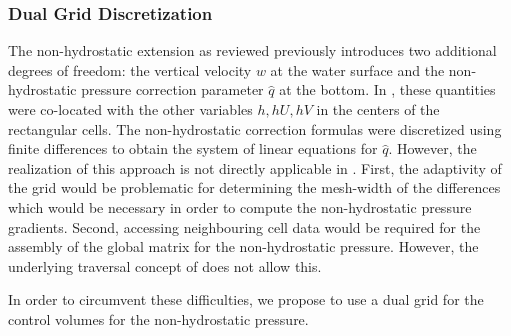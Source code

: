 \subsubsection*{Dual Grid Discretization}
The non-hydrostatic extension as reviewed previously introduces two additional degrees of freedom: the vertical velocity $w$ at the water surface and the non-hydrostatic pressure correction parameter $\hat q$ at the bottom. In \cite{samfass14extension}, these quantities were co-located with the other variables $h,hU,hV$ in the centers of the rectangular cells. The non-hydrostatic correction formulas were discretized using finite differences to obtain the system of linear equations for $\hat q$. However, the realization of this approach is not directly applicable in \samoa. First, the adaptivity of the grid would be problematic for determining the mesh-width of the differences which would be necessary in order to compute the non-hydrostatic pressure gradients. Second, accessing neighbouring cell data would be required for the assembly of the global matrix for the non-hydrostatic pressure. However, the underlying traversal concept of \samoa does not allow this. 

In order to circumvent these difficulties, we propose to use a dual grid for the control volumes for the non-hydrostatic pressure. 

